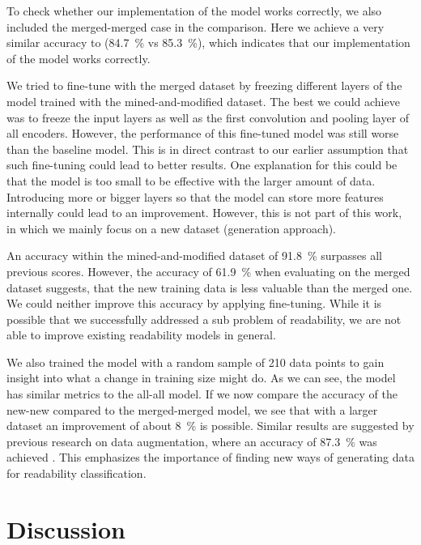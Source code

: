 \documentclass[%
class=scrreprt,
chapterprefix=false,%
open=right,%
twoside=false,%
paper=a4,%
logofile={Logo\_zentral\_farbig\_EN.png},%
thesistype=master,%
UKenglish,%
]{se2thesis}
\theoremstyle{definition}
\newenvironment{researchbox}[1]{\begin{tcolorbox}[colback=blue!10!white,colframe=blue!50!black,title=#1]}{\end{tcolorbox}}
\begin{document}
	To check whether our implementation of the model works correctly, we also included the merged-merged case in the comparison. Here we achieve a very similar accuracy to \citeauthor{mi2022towards} (84.7~\% vs 85.3~\%), which indicates that our implementation of the model works correctly.
	
	We tried to fine-tune with the merged dataset by freezing different layers of the model trained with the mined-and-modified dataset. The best we could achieve was to freeze the input layers as well as the first convolution and pooling layer of all encoders. However, the performance of this fine-tuned model was still worse than the baseline model. This is in direct contrast to our earlier assumption that such fine-tuning could lead to better results. One explanation for this could be that the model is too small to be effective with the larger amount of data. Introducing more or bigger layers so that the model can store more features internally could lead to an improvement. However, this is not part of this work, in which we mainly focus on a new dataset (generation approach).
	
	\begin{researchbox}{Summary (RQ3 - new-data):}
		An accuracy within the mined-and-modified dataset of 91.8~\% surpasses all previous scores. However, the accuracy of 61.9~\% when evaluating on the merged dataset suggests, that the new training data is less valuable than the merged one. We could neither improve this accuracy by applying fine-tuning. While it is possible that we successfully addressed a sub problem of readability, we are not able to improve existing readability models in general.
	\end{researchbox}
	
	We also trained the model with a random sample of 210 data points to gain insight into what a change in training size might do. As we can see, the model has similar metrics to the all-all model. If we now compare the accuracy of the new-new compared to the merged-merged model, we see that with a larger dataset an improvement of about 8~\% is possible. Similar results are suggested by previous research on data augmentation, where an accuracy of 87.3~\% was achieved \citeauthor{mi2021effectiveness}. This emphasizes the importance of finding new ways of generating data for readability classification. 
	
\section{Discussion} \label{Discussion}
\end{document}
